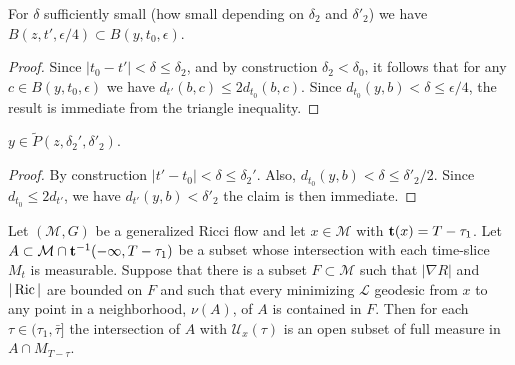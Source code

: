 \begin{claim}\label{claim:parabolic-ball-containment}
For $\delta$ sufficiently small (how small depending on $\delta_2$
and $\delta'_2$) we have $B(z,t',\epsilon/4)\subset
B(y,t_0,\epsilon)$.
\end{claim}

\begin{proof}
\sketch
Since $|t_0-t'|<\delta\le \delta_2$, and by construction
$\delta_2<\delta_0$, it follows  that for any $c\in
B(y,t_0,\epsilon)$ we have $d_{t'}(b,c)\le 2d_{t_0}(b,c)$. Since
$d_{t_0}(y,b)<\delta\le \epsilon/4$, the result is immediate from
the triangle inequality.
\end{proof}

\begin{claim}\label{claim:point-in-parabolic-neighborhood}
$y\in \widetilde P(z,\delta_2',\delta'_2)$.
\end{claim}

\begin{proof}
\sketch
By construction $|t'-t_0|<\delta\le \delta_2'$. Also,
$d_{t_0}(y,b)<\delta\le \delta'_2/2$. Since $d_{t_0}\le 2d_{t'}$, we
have $d_{t'}(y,b)< \delta'_2$ the claim is then immediate.
\end{proof}

\begin{corollary}\label{cor:reduced-length-full-measure}
\label{fullmeasure}

Let $({\mathcal M},G)$ be a generalized Ricci flow and let $x\in {\mathcal M}$
with ${\bf t}(x)=T-\tau_1$. Let
 $A\subset {\mathcal
M}\cap {\bf t}^{-1}(-\infty,T-\tau_1)$ be a subset whose intersection with each
time-slice $M_t$ is measurable. Suppose that there is a  subset $F\subset
{\mathcal M}$ such that $|\nabla R|$ and $|\operatorname{Ric}|$ are bounded on $F$ and
such that every minimizing ${\mathcal L}$ geodesic from $x$ to any point in a
neighborhood, $\nu(A)$, of $A$ is contained in $F$. Then for each $\tau\in
(\tau_1,\bar\tau]$ the intersection of $A$ with ${\mathcal U}_x(\tau)$ is an
open subset of full measure in $A\cap M_{T-\tau}$.
\end{corollary}

